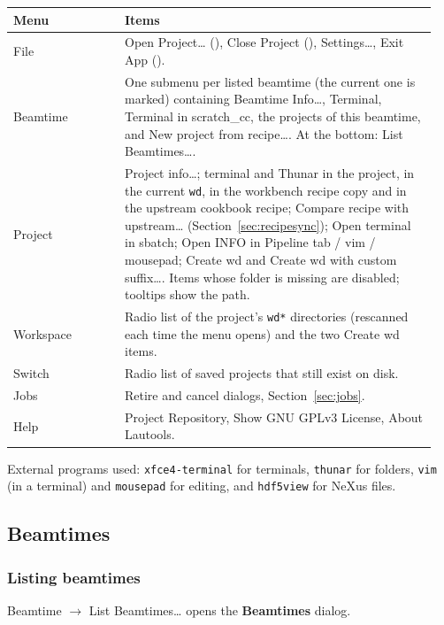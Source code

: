 \documentclass[11pt,a4paper]{article}
\newcommand{\cmd}[1]{\texttt{#1}}
\newcommand{\ui}[1]{\textsf{\textbf{#1}}}
\newcommand{\menu}[1]{\textsf{#1}}
\newcommand{\key}[1]{\tcbox[on line, boxsep=0pt, left=2pt, right=2pt, top=1pt, bottom=1pt, colback=white, colframe=gray!60, boxrule=0.4pt, arc=1.5pt]{\small\ttfamily #1}}
\begin{document}
\begin{longtable}{@{}>{\raggedright}p{0.25\linewidth}>{\raggedright\arraybackslash}p{0.7\linewidth}@{}}
\toprule
Menu & Items \\
\midrule
\endhead
\menu{File} & \menu{Open Project\ldots} (\key{Ctrl+O}), \menu{Close Project} (\key{Ctrl+W}), \menu{Settings\ldots}, \menu{Exit App} (\key{Ctrl+Q}). \\
\menu{Beamtime} & One submenu per listed beamtime (the current one is marked) containing \menu{Beamtime Info\ldots}, \menu{Terminal}, \menu{Terminal in scratch\_cc}, the projects of this beamtime, and \menu{New project from recipe\ldots}. At the bottom: \menu{List Beamtimes\ldots}. \\
\menu{Project} & \menu{Project info\ldots}; terminal and Thunar in the project, in the current \cmd{wd}, in the workbench recipe copy and in the upstream cookbook recipe; \menu{Compare recipe with upstream\ldots} (Section~\ref{sec:recipesync}); \menu{Open terminal in sbatch}; \menu{Open INFO in Pipeline tab / vim / mousepad}; \menu{Create wd} and \menu{Create wd with custom suffix\ldots}. Items whose folder is missing are disabled; tooltips show the path. \\
\menu{Workspace} & Radio list of the project's \cmd{wd*} directories (rescanned each time the menu opens) and the two \menu{Create wd} items. \\
\menu{Switch} & Radio list of saved projects that still exist on disk. \\
\menu{Jobs} & Retire and cancel dialogs, Section~\ref{sec:jobs}. \\
\menu{Help} & \menu{Project Repository}, \menu{Show GNU GPLv3 License}, \menu{About Lautools}. \\
\bottomrule
\end{longtable}

External programs used: \cmd{xfce4-terminal} for terminals, \cmd{thunar} for folders, \cmd{vim}
(in a terminal) and \cmd{mousepad} for editing, and \cmd{hdf5view} for NeXus files.

\subsection{Beamtimes}

\subsubsection*{Listing beamtimes}

\menu{Beamtime $\rightarrow$ List Beamtimes\ldots} opens the \ui{Beamtimes} dialog.
\end{document}
